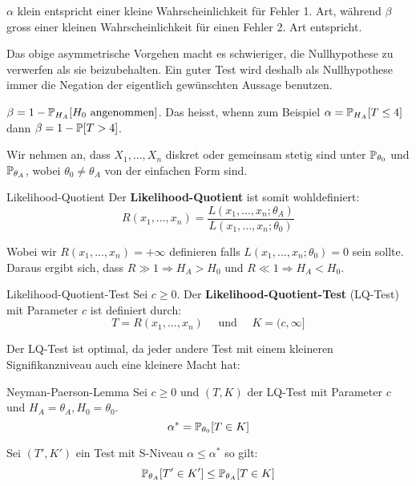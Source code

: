 \Bem $\alpha$ klein entspricht einer kleine Wahrscheinlichkeit für Fehler 1. Art, während $\beta$ gross einer kleinen Wahrscheinlichkeit für einen Fehler 2. Art entspricht. \smallskip

Das obige asymmetrische Vorgehen macht es schwieriger, die Nullhypothese zu verwerfen als sie beizubehalten. Ein guter Test wird deshalb als Nullhypothese immer die Negation der eigentlich gewünschten Aussage benutzen.

\Bem $\beta = 1 - \mathbb{P}_{H_A}[H_0 \text{ angenommen}]$. Das heisst, whenn zum Beispiel $\alpha = \mathbb{P}_{H_A}[T \leq 4]$ dann $\beta = 1 - \mathbb{P}[T > 4]$.





Wir nehmen an, dass $X_1,...,X_n$ diskret oder gemeinsam stetig sind unter $\mathbb{P}_{\theta_0}$ und $\mathbb{P}_{\theta_A}$, wobei $\theta_0 \neq \theta_A$ von der einfachen Form sind. \smallskip

\begin{subbox}{Likelihood-Quotient}
Der \textbf{Likelihood-Quotient} ist somit wohldefiniert:
$$R(x_1,...,x_n) = \frac{L(x_1,...,x_n; \theta_A)}{L(x_1,...,x_n; \theta_0)}$$
\end{subbox}

Wobei wir $R(x_1,...,x_n) = + \infty$ definieren falls $L(x_1,...,x_n; \theta_0) = 0$ sein sollte. Daraus ergibt sich, dass $R \gg 1 \Rightarrow H_A > H_0$ und $R \ll 1 \Rightarrow H_A < H_0$. \smallskip

\begin{mainbox}{Likelihood-Quotient-Test} 
    Sei $c \geq 0$. Der \textbf{Likelihood-Quotient-Test} (LQ-Test) mit Parameter $c$ ist definiert durch:
    $$ T = R(x_1,...,x_n) \quad \text{ und } \quad K = (c, \infty] $$
\end{mainbox}

Der LQ-Test ist optimal, da jeder andere Test mit einem kleineren Signifikanzniveau auch eine kleinere Macht hat:

\begin{mainbox}{Neyman-Paerson-Lemma}
    Sei $c \geq 0$ und $(T,K)$ der LQ-Test mit Parameter $c$ und $H_A = \theta_A, H_0 = \theta_0$.
$$\alpha^* = \mathbb{P}_{\theta_0}[T \in K]$$

Sei $(T', K')$ ein Test mit S-Niveau $\alpha \leq \alpha^*$ so gilt:
$$\mathbb{P}_{\theta_A}[T' \in K'] \leq \mathbb{P}_{\theta_A}[T \in K]$$
\end{mainbox}

